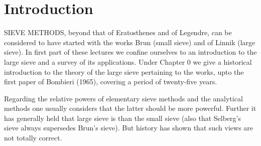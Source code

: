 \chapter{Introduction}


SIEVE METHODS, beyond that of Eratosthenes and of Legendre, can be
considered to have started with the works Brun (small sieve) and of
Linnik (large sieve). In first part of these lectures we confine
ourselves to an introduction to the large sieve and a survey of its
applications. Under Chapter $0$ we give a historical introduction to
the theory of the large sieve pertaining to the works, upto the first
paper of Bombieri (1965), covering a period of twenty-five years. 

Regarding the relative powers of elementary sieve methods and the
analytical methods one usually considers that the latter should be
more powerful. Further it has generally held that large sieve is than
the small sieve (also that Selberg's sieve always supersedes Brun's
sieve). But history has shown that such views are not totally
correct. 

